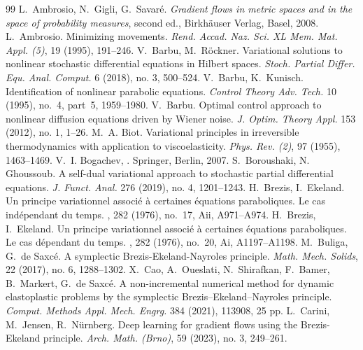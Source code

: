 \documentclass[10pt,a4paper]{amsart}
\begin{document}
\begin{thebibliography}{99}
 L.~Ambrosio, N.~Gigli, G.~Savar{\'e}. \emph{Gradient flows in metric spaces and in the space of probability measures}, second ed., Birkh\"auser Verlag, Basel, 2008.
 L.~Ambrosio. Minimizing movements. {\it Rend. Accad. Naz. Sci. XL Mem. Mat. Appl. (5)}, 19 (1995), 191--246.
 V.~Barbu, M.~R\"ockner. Variational solutions to nonlinear stochastic differential equations in Hilbert spaces. {\it Stoch. Partial Differ. Equ. Anal. Comput.} 6 (2018), no. 3, 500--524.
 V.~Barbu, K.~Kunisch. Identification of nonlinear parabolic equations. {\it Control Theory Adv. Tech.} 10 (1995), no.~4, part~5, 1959--1980.
 V.~Barbu. Optimal control approach to nonlinear diffusion equations driven by Wiener noise. {\it J. Optim. Theory Appl.} 153 (2012), no. 1, 1--26.
 M.~A. Biot. {Variational principles in irreversible thermodynamics with application to viscoelasticity}. {\it Phys. Rev. (2)}, 97 (1955), 1463--1469.
 V.~I. Bogachev, . \newblock Springer, Berlin, 2007.
 S.~Boroushaki, N.~ Ghoussoub. A self-dual variational approach to stochastic partial differential equations. {\it J. Funct. Anal.} 276 (2019), no. 4, 1201--1243.
 H.~Brezis, I.~Ekeland. \newblock Un principe variationnel associ\'e \`a certaines \'equations paraboliques. {L}e cas ind\'ependant du temps. , 282 (1976), no.~17, Aii, A971--A974.
 H.~Brezis, I.~Ekeland. \newblock Un principe variationnel associ\'e \`a certaines \'equations paraboliques. {L}e cas d\'ependant du temps. , 282 (1976), no.~20, Ai, A1197--A1198.
 M.~Buliga, G.~de Saxc\'e. A symplectic Brezis-Ekeland-Nayroles principle. {\it Math. Mech. Solids}, 22 (2017), no. 6, 1288--1302.
 X.~Cao, A.~Oueslati, N.~Shirafkan, F.~Bamer, B.~Markert, G.~de Saxc\'e. A non-incremental numerical method for dynamic elastoplastic problems by the symplectic Brezis--Ekeland--Nayroles principle. {\it Comput. Methods Appl. Mech. Engrg.} 384 (2021), 113908, 25 pp.
 L.~Carini, M.~Jensen, R.~N\"urnberg. Deep learning for gradient flows using the Brezis-Ekeland principle. {\it Arch. Math. (Brno)}, 59 (2023), no. 3, 249--261.

\end{thebibliography}
\end{document}

